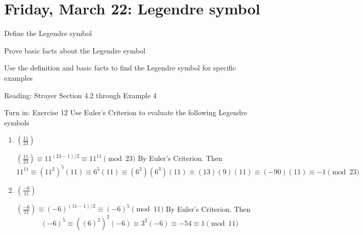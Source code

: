 \documentclass[letterpaper, 11 pt]{ximera}
\theoremstyle{definition}
\begin{document}
\section{Friday, March 22: Legendre symbol}

\begin{obj}
    \item Define the Legendre symbol
    \item Prove basic facts about the Legendre symbol
    \item Use the definition and basic facts to find the Legendre symbol for specific examples
\end{obj}


\begin{pre}
    \item[Reading:] Strayer Section 4.2 through Example 4
    \item[Turn in:] Exercise 12
     Use Euler's Criterion to evaluate the following Legendre symbols 
	\begin{enumerate}
 		\item $\left(\frac{11}{23}\right)$
		
		\begin{solution}
 			$\left(\frac{11}{23}\right)\equiv 11^{(23-1)/2}\equiv 11^{11}\pmod{23}$ By Euler's Criterion. Then
			\[11^{11}\equiv (11^{2})^{5}(11)\equiv 6^5(11)\equiv (6^2)(6^3)(11)\equiv (13)(9)(11)\equiv(-90)(11)\equiv -1\pmod{23}\]
		\end{solution}
		
		\item $\left(\frac{-6}{11}\right)$
		
		\begin{solution}
 			$\left(\frac{-6}{11}\right)\equiv (-6)^{(11-1)/2}\equiv (-6)^{5}\pmod{11}$ By Euler's Criterion. Then
			\[(-6)^{5}\equiv ((6)^{2})^{2}(-6)\equiv 3^2(-6)\equiv -54 \equiv 1\pmod{11}\]
		\end{solution}
	\end{enumerate}
 

    \end{pre}
\end{document}
